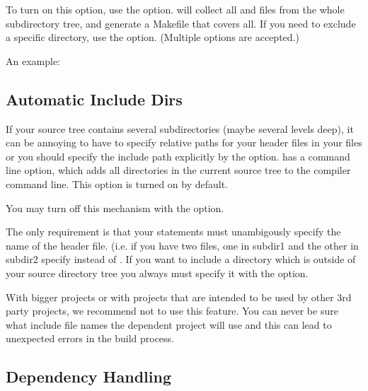 To turn on this option, use the  option.
 will collect all  and  files from
the whole subdirectory tree, and generate a Makefile that covers all.
If you need to exclude a specific directory, use the 
option. (Multiple  options are accepted.)

An example:



\subsection{Automatic Include Dirs}
\label{sec:build-sim-progs:automatic-include-dirs}

If your source tree contains several subdirectories (maybe several levels
deep), it can be annoying to have to specify relative paths for your
header files in your  files or you should specify the include path
explicitly by the  option.  has a
command line option, which adds all directories in the current source tree
to the compiler command line. This option is turned on by default.

\begin{note}
You may turn off this mechanism with the  option.
\end{note}

The only requirement is that your  statements must unambigously
specify the name of the header file. (i.e. if you have two 
files, one in subdir1 and the other in subdir2 specify  instead of . If you want to
include a directory which is outside of your source directory tree you
always must specify it with the  option.

\begin{note}
With bigger projects or with projects that are intended to be used by other
3rd party projects, we recommend not to use this feature. You can never be sure
what include file names the dependent project will use and this can lead to
unexpected errors in the build process.
\end{note}


\subsection{Dependency Handling}
\label{sec:build-sim-progs:dependency-handling}

